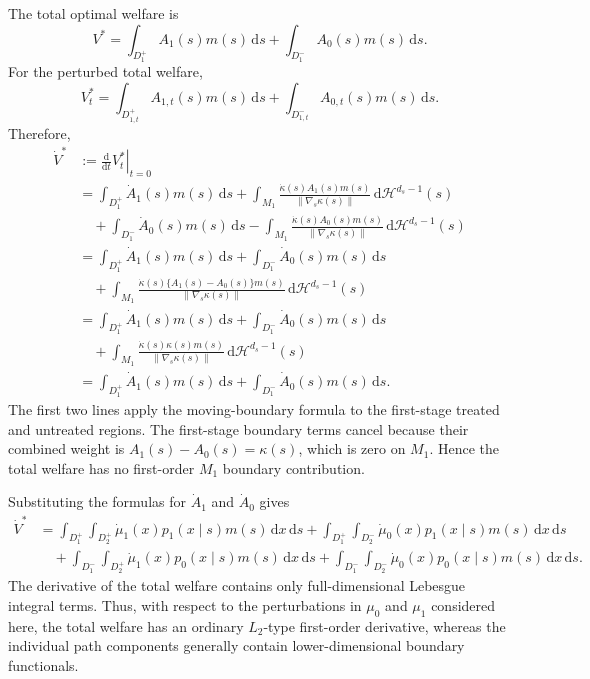\documentclass[12pt]{article}
\newcommand{\1}{\mathbf{1}}
\begin{document}
The total optimal welfare is
\[
V^*
=
\int_{D_1^+}A_1(s)m(s)\,\mathrm ds
+
\int_{D_1^-}A_0(s)m(s)\,\mathrm ds.
\]
For the perturbed total welfare,
\[
V_t^*
=
\int_{D_{1,t}^+}A_{1,t}(s)m(s)\,\mathrm ds
+
\int_{D_{1,t}^-}A_{0,t}(s)m(s)\,\mathrm ds.
\]
Therefore,
\begin{align*}
\dot V^*
&:=
\left.\frac{\mathrm d}{\mathrm dt}V_t^*\right|_{t=0} \\
&=
\int_{D_1^+}\dot A_1(s)m(s)\,\mathrm ds
+
\int_{M_1}
\frac{\dot\kappa(s)A_1(s)m(s)}
{\lVert\nabla_s\kappa(s)\rVert}
\,\mathrm d\mathcal H^{d_s-1}(s) \\
&\quad+
\int_{D_1^-}\dot A_0(s)m(s)\,\mathrm ds
-
\int_{M_1}
\frac{\dot\kappa(s)A_0(s)m(s)}
{\lVert\nabla_s\kappa(s)\rVert}
\,\mathrm d\mathcal H^{d_s-1}(s) \\
&=
\int_{D_1^+}\dot A_1(s)m(s)\,\mathrm ds
+
\int_{D_1^-}\dot A_0(s)m(s)\,\mathrm ds \\
&\quad+
\int_{M_1}
\frac{\dot\kappa(s)\{A_1(s)-A_0(s)\}m(s)}
{\lVert\nabla_s\kappa(s)\rVert}
\,\mathrm d\mathcal H^{d_s-1}(s) \\
&=
\int_{D_1^+}\dot A_1(s)m(s)\,\mathrm ds
+
\int_{D_1^-}\dot A_0(s)m(s)\,\mathrm ds \\
&\quad+
\int_{M_1}
\frac{\dot\kappa(s)\kappa(s)m(s)}
{\lVert\nabla_s\kappa(s)\rVert}
\,\mathrm d\mathcal H^{d_s-1}(s) \\
&=
\int_{D_1^+}\dot A_1(s)m(s)\,\mathrm ds
+
\int_{D_1^-}\dot A_0(s)m(s)\,\mathrm ds.
\end{align*}
The first two lines apply the moving-boundary formula to the first-stage
treated and untreated regions. The first-stage boundary terms cancel because
their combined weight is $A_1(s)-A_0(s)=\kappa(s)$, which is zero on $M_1$.
Hence the total welfare has no first-order $M_1$ boundary contribution.

Substituting the formulas for $\dot A_1$ and $\dot A_0$ gives
\begin{align*}
\dot V^*
&=
\int_{D_1^+}\int_{D_2^+}
\dot\mu_1(x)p_1(x\mid s)m(s)\,\mathrm dx\,\mathrm ds
+
\int_{D_1^+}\int_{D_2^-}
\dot\mu_0(x)p_1(x\mid s)m(s)\,\mathrm dx\,\mathrm ds \\
&\quad+
\int_{D_1^-}\int_{D_2^+}
\dot\mu_1(x)p_0(x\mid s)m(s)\,\mathrm dx\,\mathrm ds
+
\int_{D_1^-}\int_{D_2^-}
\dot\mu_0(x)p_0(x\mid s)m(s)\,\mathrm dx\,\mathrm ds.
\end{align*}
The derivative of the total welfare contains only full-dimensional Lebesgue
integral terms. Thus, with respect to the perturbations in $\mu_0$ and
$\mu_1$ considered here, the total welfare has an ordinary $L_2$-type
first-order derivative, whereas the individual path components generally
contain lower-dimensional boundary functionals.
\end{document}

